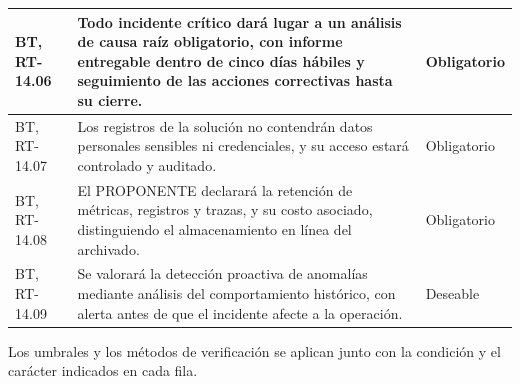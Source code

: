 \begin{longtable}{|L{0.098425\AnchoTablaAnexo}|L{0.814961\AnchoTablaAnexo}|L{0.086614\AnchoTablaAnexo}|}
BT, RT-14.06 &
Todo incidente crítico dará lugar a un análisis de causa raíz obligatorio, con informe entregable dentro de cinco días hábiles y seguimiento de las acciones correctivas hasta su cierre. &
Obligatorio \\ \hline
{}
BT, RT-14.07 &
Los registros de la solución no contendrán datos personales sensibles ni credenciales, y su acceso estará controlado y auditado. &
Obligatorio \\ \hline
BT, RT-14.08 &
El PROPONENTE declarará la retención de métricas, registros y trazas, y su costo asociado, distinguiendo el almacenamiento en línea del archivado. &
Obligatorio \\ \hline
{}
BT, RT-14.09 &
Se valorará la detección proactiva de anomalías mediante análisis del comportamiento histórico, con alerta antes de que el incidente afecte a la operación. &
Deseable \\ \hline
\end{longtable}

Los umbrales y los métodos de verificación se aplican junto con la condición y el carácter indicados en cada fila.
